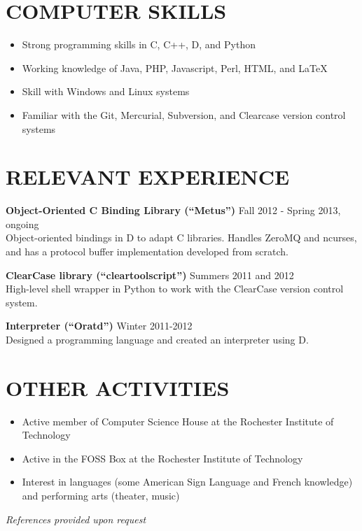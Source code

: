 \documentclass[line]{res}
\begin{document}
\begin{resume}
\section{COMPUTER SKILLS}

	\begin{itemize}[leftmargin=10pt]
	\item Strong programming skills in C, C++, D, and Python
	\item Working knowledge of Java, PHP, Javascript, Perl, HTML, and LaTeX
	\item Skill with Windows and Linux systems
	\item Familiar with the Git, Mercurial, Subversion, and Clearcase version control systems
	\end{itemize}

\section{RELEVANT EXPERIENCE}

	\textbf{Object-Oriented C Binding Library (``Metus'')}
	\hfill
	Fall 2012 - Spring 2013, ongoing
	\\
	Object-oriented bindings in D to adapt C libraries. Handles ZeroMQ and ncurses, and has a protocol buffer implementation developed from scratch.
	
	\textbf{ClearCase library (``cleartoolscript'')}
	\hfill
	Summers 2011 and 2012
	\\
	High-level shell wrapper in Python to work with the ClearCase version control system.
	
	\textbf{Interpreter (``Oratd'')}
	\hfill
	Winter 2011-2012
	\\
	Designed a programming language and created an interpreter using D.%

\section{OTHER ACTIVITIES}
	\begin{itemize}[leftmargin=10pt]
	\item Active member of Computer Science House at the Rochester Institute of Technology
	\item Active in the FOSS Box at the Rochester Institute of Technology
	\item Interest in languages (some American Sign Language and French knowledge) and performing arts (theater, music)
	\end{itemize}

\begin{center}
\vspace{-0.26in}\hspace{-0.8in}\emph{References provided upon request\\[8pt]}
\end{center}

\end{resume}
\end{document}
